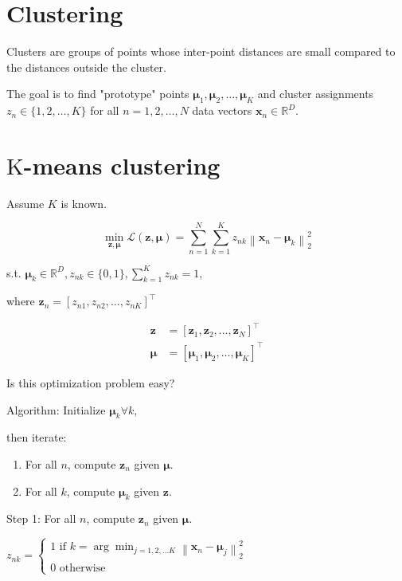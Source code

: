 
\section*{Clustering}
Clusters are groups of points whose inter-point distances are small compared to the distances outside the cluster.

The goal is to find "prototype" points $\boldsymbol{\mu}_{1}, \boldsymbol{\mu}_{2}, \ldots, \boldsymbol{\mu}_{K}$ and cluster assignments $z_{n} \in\{1,2, \ldots, K\}$ for all $n=1,2, \ldots, N$ data vectors $\mathbf{x}_{n} \in \mathbb{R}^{D}$.

\section*{$\mathrm{K}$-means clustering}
Assume $K$ is known.

$$
\min _{\mathbf{z}, \boldsymbol{\mu}} \mathcal{L}(\mathbf{z}, \boldsymbol{\mu})=\sum_{n=1}^{N} \sum_{k=1}^{K} z_{n k}\left\|\mathbf{x}_{n}-\boldsymbol{\mu}_{k}\right\|_{2}^{2}
$$

s.t. $\boldsymbol{\mu}_{k} \in \mathbb{R}^{D}, z_{n k} \in\{0,1\}, \sum_{k=1}^{K} z_{n k}=1$,

where $\mathbf{z}_{n}=\left[z_{n 1}, z_{n 2}, \ldots, z_{n K}\right]^{\top}$

$$
\begin{aligned}
\mathbf{z} & =\left[\mathbf{z}_{1}, \mathbf{z}_{2}, \ldots, \mathbf{z}_{N}\right]^{\top} \\
\boldsymbol{\mu} & =\left[\boldsymbol{\mu}_{1}, \boldsymbol{\mu}_{2}, \ldots, \boldsymbol{\mu}_{K}\right]^{\top}
\end{aligned}
$$

Is this optimization problem easy?

Algorithm: Initialize $\boldsymbol{\mu}_{k} \forall k$,

then iterate:

\begin{enumerate}
  \item For all $n$, compute $\mathbf{z}_{n}$ given $\boldsymbol{\mu}$.

  \item For all $k$, compute $\boldsymbol{\mu}_{k}$ given $\mathbf{z}$.

\end{enumerate}

Step 1: For all $n$, compute $\mathbf{z}_{n}$ given $\boldsymbol{\mu}$.


$z_{n k}=\left\{\begin{array}{l}1 \text { if } k=\arg \min _{j=1,2, \ldots K}\left\|\mathbf{x}_{n}-\boldsymbol{\mu}_{j}\right\|_{2}^{2} \\ 0 \text { otherwise }\end{array}\right.$

